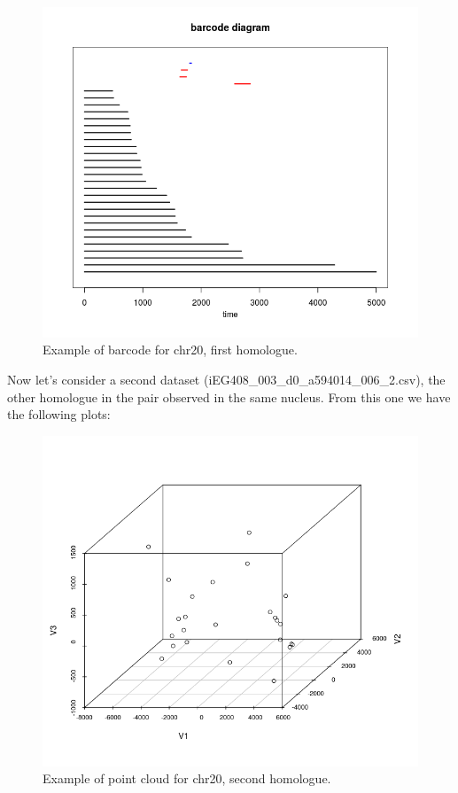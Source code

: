 \documentclass[12pt,a4paper]{article}
\begin{document}
\begin{figure}[hbtp]
\centering
\includegraphics[scale=0.75]{bc_dia.png}
\caption{Example of barcode for chr20, first homologue.}
\end{figure}

Now let's consider a second dataset (iEG408\_003\_d0\_a594\/014\_006\_2.csv), the other homologue in the pair observed in the same nucleus. From this one we have the following plots:
\begin{figure}[hbtp]
\centering
\includegraphics[scale=0.75]{a594_014_006_2.png}
\caption{Example of point cloud for chr20, second homologue.}
\end{figure}
\end{document}

